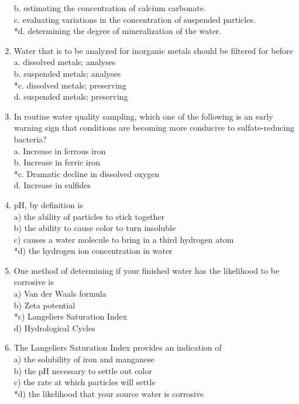 \begin{enumerate}[1.]
b. estimating the concentration of calcium carbonate.\\
c. evaluating variations in the concentration of suspended particles.\\
*d. determining the degree of mineralization of the water.
\item Water that is to be analyzed for inorganic metals should be filtered for before\\
a. dissolved metals; analyses\\
b. suspended metals; analyses\\
*c. dissolved metals; preserving\\
d. suspended metals; preserving\\
\item In routine water quality sampling, which one of the following is an early warning sign that conditions are becoming more conducive to sulfate-reducing bacteria?\\
a. Increase in ferrous iron\\
b. Increase in ferric iron\\
*c. Dramatic decline in dissolved oxygen\\
d. Increase in sulfides
\item pH, by definition is\\
a) the ability of particles to stick together\\
b) the ability to cause color to turn insoluble\\
c) causes a water molecule to bring in a third hydrogen atom\\
*d) the hydrogen ion concentration in water\\
\item One method of determining if your finished water has the likelihood to be corrosive is\\
a) Van der Waals formula\\
b) Zeta potential\\
*c) Langeliers Saturation Index\\
d) Hydrological Cycles\\
\item The Langeliers Saturation Index provides an indication of\\
a) the solubility of iron and manganese\\
b) the $\mathrm{pH}$ necessary to settle out color\\
c) the rate at which particles will settle\\
*d) the likelihood that your source water is corrosive\\

\end{enumerate}
